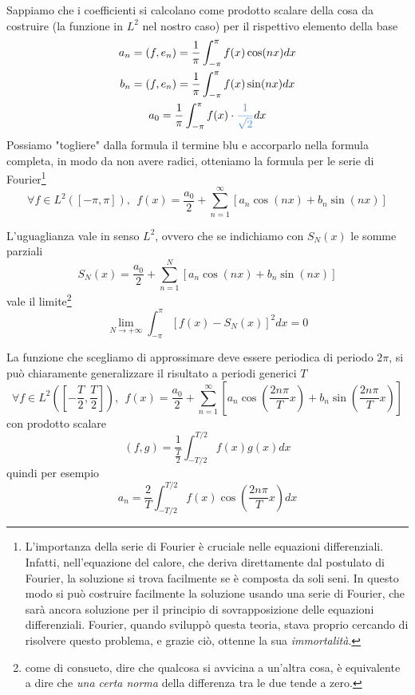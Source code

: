 Sappiamo che i coefficienti si calcolano come prodotto scalare della cosa da costruire (la funzione in $L^{2}$ nel nostro caso) per il rispettivo elemento della base
\begin{gather*}
a_{n} = (f, e_{n}) = \frac{1}{\pi}\int^{\pi}_{- \pi} f(x)\cos(nx) dx\\
b_{n} = (f, e_{n}) = \frac{1}{\pi}\int^{\pi}_{- \pi} f(x)\sin(nx) dx\\
a_{0} = \frac{1}{\pi}\int^{\pi}_{- \pi} f(x) \cdot \textcolor[rgb]{0.29, 0.56, 0.89}{\frac{1}{\sqrt{2}}} dx
\end{gather*}
Possiamo "togliere" dalla formula il termine blu e accorparlo nella formula completa, in modo da non avere radici, otteniamo la formula per le serie di Fourier\footnote{L'importanza della serie di Fourier è cruciale nelle equazioni differenziali. Infatti, nell'equazione del calore, che deriva direttamente dal postulato di Fourier, la soluzione si trova facilmente se è composta da soli seni. In questo modo si può costruire facilmente la soluzione usando una serie di Fourier, che sarà ancora soluzione per il principio di sovrapposizione delle equazioni differenziali. Fourier, quando sviluppò questa teoria, stava proprio cercando di risolvere questo problema, e grazie ciò, ottenne la sua \textit{immortalità}.}
\begin{equation*}
\boxed{\forall f\in L^{2}([- \pi, \pi]), \ \ f(x) = \frac{a_{0}}{2} + \sum\limits^{\infty}_{n = 1}[a_{n}\cos(nx) + b_{n}\sin(nx)]}
\end{equation*}
\begin{rem}
[Convergenza $L^{2}$] L'uguaglianza vale in senso $L^{2}$, ovvero che se indichiamo con $S_{N}(x)$ le somme parziali
\begin{equation*}
S_{N}(x) = \frac{a_{0}}{2} + \sum\limits^{N}_{n = 1}[a_{n}\cos(nx) + b_{n}\sin(nx)]
\end{equation*}
vale il limite\footnote{come di consueto, dire che qualcosa si avvicina a un'altra cosa, è equivalente a dire che \textit{una certa norma} della differenza tra le due tende a zero.}
\begin{equation*}
\lim\limits_{N\rightarrow + \infty}\int^{\pi}_{- \pi}[f(x) - S_{N}(x)]^{2} dx = 0
\end{equation*}
\end{rem}
\begin{rem}
La funzione che scegliamo di approssimare deve essere periodica di periodo $2\pi $, si può chiaramente generalizzare il risultato a periodi generici $T$
\begin{equation*}
\forall f\in L^{2}\left(\left[- \frac{T}{2}, \frac{T}{2}\right]\right), \ \ f(x) = \frac{a_{0}}{2} + \sum\limits^{\infty}_{n = 1}\left[a_{n}\cos\left(\frac{2n\pi}{T} x\right) + b_{n}\sin\left(\frac{2n\pi}{T} x\right)\right]
\end{equation*}
con prodotto scalare
\begin{equation*}
(f, g) = \frac{1}{\frac{T}{2}}\int^{T/2}_{- T/2} f(x) g(x) dx
\end{equation*}
quindi per esempio
\begin{equation*}
a_{n} = \frac{2}{T}\int^{T/2}_{- T/2} f(x)\cos\left(\frac{2n\pi}{T} x\right) dx
\end{equation*}
\end{rem}
